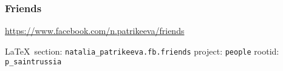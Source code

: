  
 
\subsubsection{Friends}
\url{https://www.facebook.com/n.patrikeeva/friends}
  
\vspace{0.5cm}
 {\ifDEBUG\small\LaTeX~section: \verb|natalia_patrikeeva.fb.friends| project: \verb|people| rootid: \verb|p_saintrussia| \fi}
\vspace{0.5cm}


